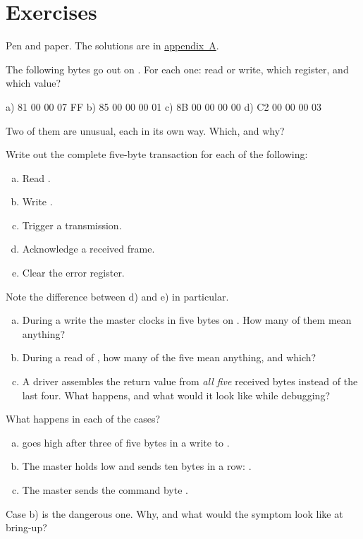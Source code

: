 \section*{Exercises}

Pen and paper. The solutions are in \hyperref[ch:losningar]{appendix~A}.

\label{ex:8:1}
The following bytes go out on . For each one: read or write, which register, and which
value?
\begin{console}
a)  81 00 00 07 FF
b)  85 00 00 00 01
c)  8B 00 00 00 00
d)  C2 00 00 00 03
\end{console}
Two of them are unusual, each in its own way. Which, and why?

\label{ex:8:2}
Write out the complete five-byte transaction for each of the following:
\begin{enumerate}[a)]
  \item Read .
  \item Write .
  \item Trigger a transmission.
  \item Acknowledge a received frame.
  \item Clear the error register.
\end{enumerate}
Note the difference between d) and e) in particular.

\label{ex:8:3}
\begin{enumerate}[a)]
  \item During a write the master clocks in five bytes on . How many of them mean
    anything?
  \item During a read of , how many of the five mean anything, and which?
  \item A driver assembles the return value from \emph{all five} received bytes instead of the
    last four. What happens, and what would it look like while debugging?
\end{enumerate}

\label{ex:8:4}
What happens in each of the cases?
\begin{enumerate}[a)]
  \item {} goes high after three of five bytes in a write to .
  \item The master holds  low and sends ten bytes in a row:
    .
  \item The master sends the command byte .
\end{enumerate}
Case b) is the dangerous one. Why, and what would the symptom look like at bring-up?

